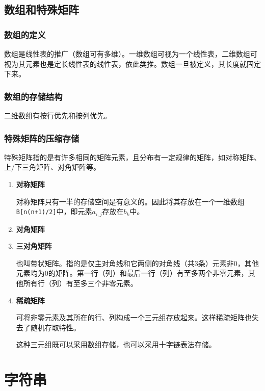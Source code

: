 \documentclass[12pt, a4paper, oneside]{ctexart}
\begin{document}
\subsection{数组和特殊矩阵}

\subsubsection{数组的定义}

数组是线性表的推广（数组可有多维）。一维数组可视为一个线性表，二维数组可视为其元素也是定长线性表的线性表，依此类推。数组一旦被定义，其长度就固定下来。

\subsubsection{数组的存储结构}

二维数组有按行优先和按列优先。

\subsubsection{特殊矩阵的压缩存储}

特殊矩阵指的是有许多相同的矩阵元素，且分布有一定规律的矩阵，如对称矩阵、上/下三角矩阵、对角矩阵等。

\begin{enumerate}
  \item {\bf 对称矩阵}
  
  对称矩阵只有一半的存储空间是有意义的。因此将其存放在一个一维数组\verb|B[n(n+1)/2]|中，即元素$a_{i,j}$存放在$b_k$中。

  \item {\bf 对角矩阵}
  
  \item {\bf 三对角矩阵}
  
  也叫带状矩阵。指的是仅主对角线和它两侧的对角线（共3条）元素非0，其他元素均为0的矩阵。第一行（列）和最后一行（列）有至多两个非零元素，其他所有行（列）有至多三个非零元素。
  
  \item {\bf 稀疏矩阵}
  
  可将非零元素及其所在的行、列构成一个三元组存放起来。这样稀疏矩阵也失去了随机存取特性。

  这种三元组既可以采用数组存储，也可以采用十字链表法存储。

\end{enumerate}

\section{字符串}
\end{document}
